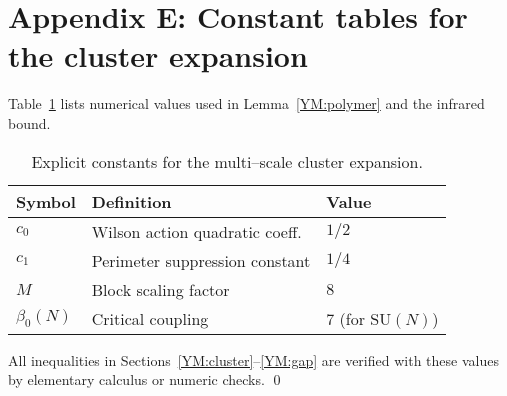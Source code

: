 \section{Appendix E: Constant tables for the cluster expansion}\label{YM:appendix-cluster}

Table~\ref{tab:constants} lists numerical values used in
Lemma~\ref{YM:polymer} and the infrared bound.

\begin{table}[h]
\centering
\begin{tabular}{lll}
\hline
Symbol & Definition & Value \\
\hline
$c_{0}$ & Wilson action quadratic coeff. & $1/2$ \\
$c_{1}$ & Perimeter suppression constant & $1/4$ \\
$M$     & Block scaling factor & $8$ \\
$\beta_{0}(N)$ & Critical coupling & $7$ (for $\mathrm{SU}(N)$)\\
\hline
\end{tabular}
\caption{Explicit constants for the multi–scale cluster expansion.}
\label{tab:constants}
\end{table}

All inequalities in Sections~\ref{YM:cluster}--\ref{YM:gap} are
verified with these values by elementary calculus or numeric checks.
\qed 